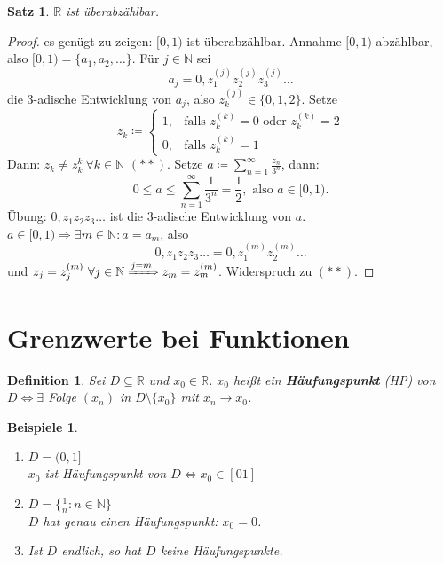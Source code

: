 \documentclass[titlepage,ngerman,a4paper,headsepline]{scrartcl}
\newcommand{\N}{\mathbb{N}}
\newcommand{\R}{\mathbb{R}}
\theoremstyle{named}
\theoremstyle{dotless}
\newtheorem{satz}[namedtheorem]{Satz}
\newtheorem*{beispiele}{Beispiele}
\newtheorem*{definition}{Definition}
\begin{document}
\begin{satz} \label{5.3:satz}
	$\R$ ist überabzählbar.
\end{satz}

\begin{proof}
	es genügt zu zeigen: $[0, 1)$ ist überabzählbar. Annahme $[0, 1)$ abzählbar, also $[0, 1) = \{ a_{1}, a_{2}, \dotsc \}$. Für $j \in \N$ sei
		$$ a_{j} = 0, z_{1}^{(j)} z_{2}^{(j)} z_{3}^{(j)} \dotsc $$
	die 3-adische Entwicklung von $a_{j}$, also $z_{k}^{(j)} \in \{ 0, 1, 2 \}$. Setze
		$$ z_{k} \coloneqq \begin{cases} 1, & \text{falls } z_{k}^{(k)} = 0 \text{ oder } z_{k}^{(k)} = 2 \\ 0, & \text{falls } z_{k}^{(k)} = 1 \end{cases} $$
	Dann: $z_{k} \neq z_{k}^{k} ~\forall k \in \N$ $(**)$. Setze $a \coloneqq \sum_{n=1}^{\infty} \frac{z_{n}}{3^{n}}$, dann:
		$$ 0 \leq a \leq \sum_{n=1}^{\infty} \frac{1}{3^{n}} = \frac{1}{2}, \text{ also } a \in [0, 1). $$
	Übung: $0, z_{1} z_{2} z_{3} \dotsc$ ist die 3-adische Entwicklung von $a$.$a \in [0, 1) \Rightarrow \exists m \in \N: a = a_{m}$, also
		$$ 0, z_{1} z_{2} z_{3} \dotsc = 0, z_{1}^{(m)} z_{2}^{(m)} \dotsc $$
	und $z_{j} = z_{j}^{(m)} ~\forall j \in \N \xRightarrow[]{j = m} z_{m} = z_{m}^{(m)}$. Widerspruch zu $(**)$.
\end{proof}


\newpage


\section{Grenzwerte bei Funktionen}

\begin{definition}
	Sei $D \subseteq \R$ und $x_{0} \in \R$. $x_{0}$ hei{\ss}t ein \textbf{Häufungspunkt} (HP) von $D \iff \exists$ Folge $(x_{n})$ in $D \setminus \{ x_{0} \}$ mit $x_{n} \rightarrow x_{0}$.
\end{definition}


\begin{beispiele}
	\begin{enumerate}
		\item $D = (0, 1]$ \\ %
			$x_{0}$ ist Häufungspunkt von $D \iff x_{0} \in [0 1]$
		\item $D = \{ \frac{1}{n} : n \in \N \}$ \\ %
			$D$ hat genau einen Häufungspunkt: $x_{0} = 0$.
		\item Ist $D$ endlich, so hat $D$ keine Häufungspunkte. 
	\end{enumerate}	
\end{beispiele}
\end{document}
